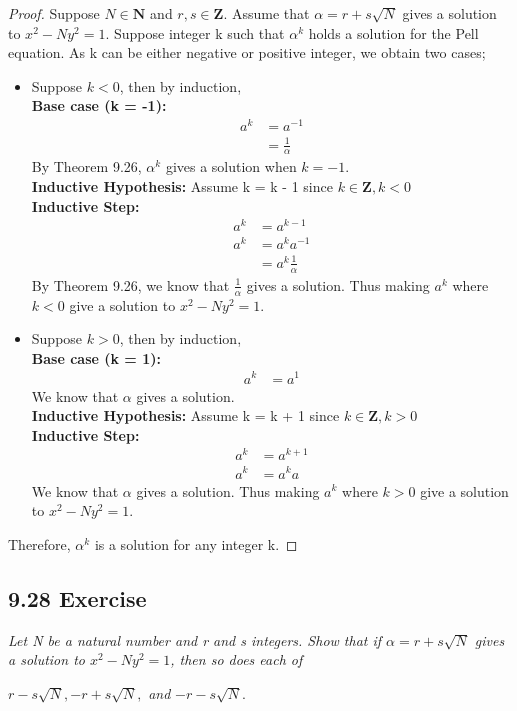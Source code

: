 \documentclass{article}
\begin{document}
\begin{proof}
Suppose $N \in \mathbf{N}$ and $r,s \in \mathbf{Z}$. Assume that $\alpha = r+s\sqrt{N}$ gives a solution to $x^2 - Ny^2 = 1$. Suppose integer k such that $\alpha^k$ holds a solution for the Pell equation. As k can be either negative or positive integer, we obtain two cases;
\begin{itemize}
    \item Suppose $k < 0$, then by induction,\\
    \textbf{Base case (k = -1):  }
    \begin{align*}
        && a^{k} &= a^{-1}&&\\
        &&       &= \frac{1}{\alpha}
    \end{align*}
    By Theorem 9.26, $\alpha^k$ gives a solution when $ k = -1$.\\
    \textbf{Inductive Hypothesis: } Assume k = k - 1 since $k \in \mathbf{Z}, k < 0$ \\
    \textbf{Inductive Step: }     
    \begin{align*}
        && a^{k} &= a^{k-1}&&\\
        && a^{k} &= a^{k}a^{-1}&&\\
        &&       &= a^{k}\frac{1}{\alpha}
    \end{align*}
    By Theorem 9.26, we know that $\frac{1}{\alpha}$ gives a solution. Thus making $a^k$ where $k <0$ give a solution to $x^2 - Ny^2 = 1$.
    \item Suppose $k > 0$, then by induction,\\
    \textbf{Base case (k = 1):  }
    \begin{align*}
        && a^{k} &= a^{1}&&
    \end{align*}
    We know that $\alpha$ gives a solution.\\
    \textbf{Inductive Hypothesis: } Assume k = k + 1 since $k \in \mathbf{Z}, k > 0$ \\
    \textbf{Inductive Step: }     
    \begin{align*}
        && a^{k} &= a^{k+1}&&\\
        && a^{k} &= a^{k}a&&
    \end{align*}
    We know that $\alpha$ gives a solution. Thus making $a^k$ where $k > 0$ give a solution to $x^2 - Ny^2 = 1$.
\end{itemize}
Therefore, $\alpha^k$ is a solution for any integer k.
\end{proof}

\subsection*{9.28 Exercise} 
\quad \textit{Let N be a natural number and r and s integers. Show that if $\alpha = r+s\sqrt{N}$ gives a solution to $x^2 - Ny^2 = 1$, then so does each of}
\begin{center}
    $r - s\sqrt{N}, -r + s\sqrt{N},$\textit{ and }$-r - s\sqrt{N}$.
\end{center}
\end{document}
